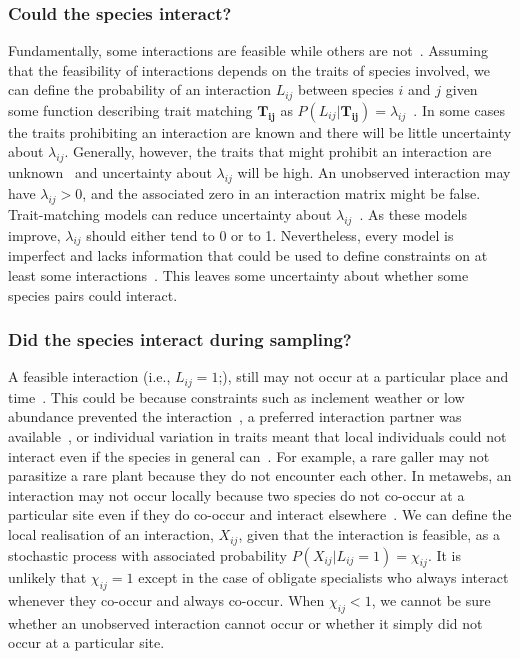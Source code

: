 \documentclass[12pt]{article}
\begin{document}
\begin{spacing}{1.5}
        \subsubsection*{Could the species interact?} 

          Fundamentally, some interactions are feasible while others are not~\citep{Poisot2015}. Assuming that the feasibility of interactions depends on the traits of species involved, we can define the probability of an interaction $L_{ij}$ between species $i$ and $j$ given some function describing trait matching $\mathbf{T_{ij}}$ as $P(L_{ij}|\mathbf{T_{ij}})=\lambda_{ij}$~\citep{Bartomeus2013,Gravel2013,Weinstein2017}. In some cases the traits prohibiting an interaction are known and there will be little uncertainty about $\lambda_{ij}$. Generally, however, the traits that might prohibit an interaction are unknown~\citep{Dormann2017} and uncertainty about $\lambda_{ij}$ will be high. 
          An unobserved interaction may have $\lambda_{ij}>0$, and the associated zero in an interaction matrix might be false. Trait-matching models can reduce uncertainty about $\lambda_{ij}$~\citep{Jordano2016}. As these models improve, $\lambda_{ij}$ should either tend to 0 or to 1. Nevertheless, every model is imperfect and lacks information that could be used to define constraints on at least some interactions~\citep{Dormann2017}. This leaves some uncertainty about whether some species pairs could interact.


        \subsubsection*{Did the species interact during sampling?} 

          A feasible interaction (i.e., $L_{ij}=1$;), still may not occur at a particular place and time~\citep{Poisot2015}. This could be because constraints such as inclement weather or low abundance prevented the interaction~\citep{Jordano2016}, a preferred interaction partner was available~\citep{Weinstein2017a}, or individual variation in traits meant that local individuals could not interact even if the species in general can~\citep{Gravel2013,Wells2013,Poisot2015}. For example, a rare galler may not parasitize a rare plant because they do not encounter each other. In metawebs, an interaction may not occur locally because two species do not co-occur at a particular site even if they do co-occur and interact elsewhere~\citep{Graham2018}. We can define the local realisation of an interaction, $X_{ij}$, given that the interaction is feasible, as a stochastic process with associated probability $P(X_{ij}|L_{ij}=1)=\chi_{ij}$. It is unlikely that $\chi_{ij}=1$  except in the case of obligate specialists who always interact whenever they co-occur and always co-occur. When $\chi_{ij}<1$, we cannot be sure whether an unobserved interaction cannot occur or whether it simply did not occur at a particular site.



\end{spacing}
\end{document}
